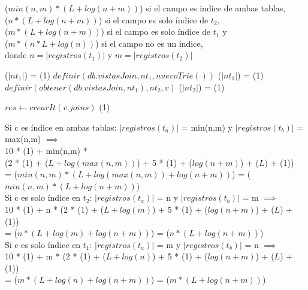     {\bigo($min(n,m) * (L + log(n + m))$) si el campo es indice de ambas tablas, \\
        \hspace*{8.25em} \bigo($n * (L + log(n + m))$) si el campo es solo índice de $t_2$, \\
        \hspace*{8.25em} \bigo($m * (L + log(n + m))$) si el campo es solo índice de $t_1$ y \\
        \hspace*{8.25em} \bigo($m * (n * L + log(n))$) si el campo no es un índice, \\
        \hspace*{8.25em} donde $n = |registros(t_1)|$ y $m = |registros(t_2)|$}{
                              \comment \bigo($|nt_1|$) = \bigo(1)
        \State $definir(db.vistasJoin, nt_1, nuevoTrie())$          \comment \bigo($|nt_1|$) = \bigo(1)
    \EndIf
    \State $definir(obtener(db.vistasJoin, nt_1), nt_2, v)$         \comment \bigo($|nt_2|$) = \bigo(1)

    \State $res \gets crearIt(v.joins)$                             \comment \bigo(1)
}{Si c es índice en ambas tablas: $|registros(t_a)|$ = min(n,m) y $|registros(t_b)|$ = max(n,m) $\implies$ \\
    \hspace*{12em} 10 * \bigo(1) + min(n,m) * \\
    \hspace*{14em} (2 * \bigo(1) + \bigo($L + log(max(n,m))$) + 5 * \bigo(1) + \bigo($log(n + m)$) + \bigo($L$) + \bigo(1)) \\
    \hspace*{12em} = \bigo($min(n,m) * (L + log(max(n,m)) + log(n + m))$) = \bigo($min(n,m) * (L + log(n + m))$) \\

    \hspace*{8.25em} Si c es solo índice en $t_2$: $|registros(t_a)|$ = n y $|registros(t_b)|$ = m $\implies$ \\
    \hspace*{12em} 10 * \bigo(1) + n * (2 * \bigo(1) + \bigo($L + log(m)$) + 5 * \bigo(1) + \bigo($log(n + m)$) + \bigo($L$) + \bigo(1)) \\
    \hspace*{12em} = \bigo($n * (L + log(m) + log(n + m))$) = \bigo($n * (L + log(n + m))$) \\

    \hspace*{8.25em} Si c es solo índice en $t_1$: $|registros(t_a)|$ = m y $|registros(t_b)|$ = n $\implies$ \\
    \hspace*{12em} 10 * \bigo(1) + m * (2 * \bigo(1) + \bigo($L + log(n)$) + 5 * \bigo(1) + \bigo($log(n + m)$) + \bigo($L$) + \bigo(1)) \\
    \hspace*{12em} = \bigo($m * (L + log(n) + log(n + m))$) = \bigo($m * (L + log(n + m))$) \\

}
